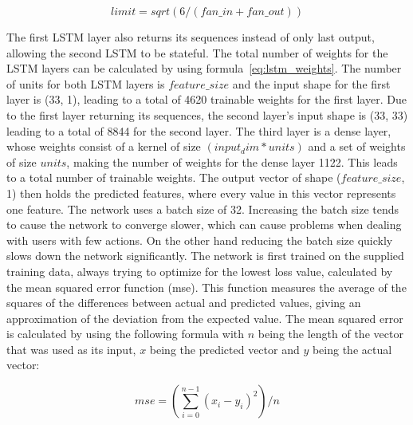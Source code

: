 \begin{equation}
limit = sqrt(6 / (fan\_in + fan\_out))
\end{equation}

The first LSTM layer also returns its sequences instead of only last output, allowing the second LSTM to be stateful. The total number of weights for the LSTM layers can be calculated by using formula~\ref{eq:lstm_weights}. The number of units for both LSTM layers is \(feature\_size\) and the input shape for the first layer is (33, 1), leading to a total of 4620 trainable weights for the first layer. Due to the first layer returning its sequences, the second layer's input shape is (33, 33) leading to a total of 8844 for the second layer. The third layer is a dense layer, whose weights consist of a kernel of size \((input_dim * units)\) and a set of weights of size \(units\), making the number of weights for the dense layer 1122. This leads to a total number of trainable weights. The output vector of shape (\(feature\_size\), 1) then holds the predicted features, where every value in this vector represents one feature. The network uses a batch size of 32. Increasing the batch size tends to cause the network to converge slower, which can cause problems when dealing with users with few actions. On the other hand reducing the batch size quickly slows down the network significantly. The network is first trained on the supplied training data, always trying to optimize for the lowest loss value, calculated by the mean squared error function (mse). This function measures the average of the squares of the differences between actual and predicted values, giving an approximation of the deviation from the expected value. The mean squared error is calculated by using the following formula with \(n\) being the length of the vector that was used as its input, \(x\) being the predicted vector and \(y\) being the actual vector:

\begin{equation} \label{eq:mse}
mse = (\sum\limits_{i=0}^{n - 1} {(x_i - y_i)}^2) / n
\end{equation}


